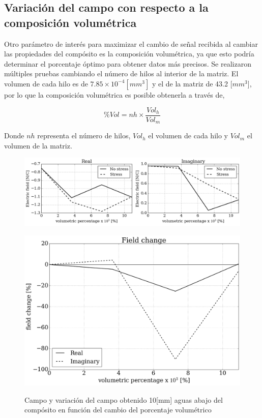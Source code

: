 \documentclass[12pt,letterpaper]{article}
\numberwithin{equation}{section}
\begin{document}
\subsection{Variación del campo con respecto a la composición volumétrica}
Otro parámetro de interés para maximizar el cambio de señal recibida al cambiar las propiedades del compósito es la composición volumétrica, ya que esto podría determinar el porcentaje óptimo para obtener datos más precisos.
Se realizaron múltiples pruebas cambiando el número de hilos al interior de la matriz. El volumen de cada hilo es de $7.85\times 10^{-4}[mm^3]$ y el de la matriz de 43.2 [$mm^3$], por lo que la composición volumétrica es posible obtenerla a través de,

$$\%Vol = nh\times\frac{Vol_h}{Vol_m}$$

Donde $nh$ representa el número de hilos, $Vol_h$ el volumen de cada hilo y $Vol_m$ el volumen de la matriz. 

\begin{figure}[H]
	\centering\includegraphics[scale=0.6]{Imagenes/field_vol_comparision.png}\\
\end{figure} 
\begin{figure}[H]
	\centering\includegraphics[scale=0.35]{Imagenes/field_vol_change.png}\\
	\caption{Campo y variación del campo obtenido 10[mm] aguas abajo del compósito en función del cambio del porcentaje volumétrico}
	\label{fig:fieldvolchange}
\end{figure}
\end{document}
